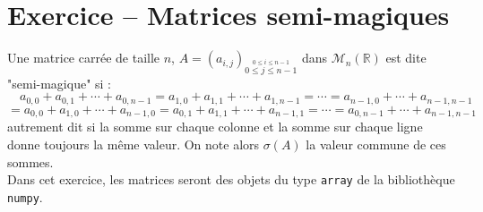 \section{Exercice -- Matrices semi-magiques}
Une matrice carrée de taille $n$, $A=(a_{i,j})_{\stackrel{\scriptstyle 0\leqslant i\leqslant  n-1}{\scriptstyle  0\leqslant  j \leqslant  n-1 }}$ dans $\mathcal{M}_n(\mathbb{R})$ est dite "semi-magique" si :\\
\[\quad a_{0,0}+a_{0,1}+\cdots+a_{0,n-1}=a_{1,0}+a_{1,1}+\cdots+a_{1,n-1}=\cdots=a_{n-1,0}+\cdots+a_{n-1,n-1}\]
\[=a_{0,0}+a_{1,0}+\cdots+a_{n-1,0}=a_{0,1}+a_{1,1}+\cdots+a_{n-1,1}=\cdots=a_{0,n-1}+\cdots+a_{n-1,n-1}\]
autrement dit si la somme sur chaque colonne et la somme sur chaque ligne donne toujours la même valeur.
On note alors $\sigma(A)$ la valeur commune de ces sommes. \\
Dans cet exercice, les matrices seront des objets du type \verb?array? de la bibliothèque \verb?numpy?.
